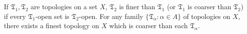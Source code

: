 If $\mathfrak{T}_1, \mathfrak{T}_2$ are topologies on a set $X$, $\mathfrak{T}_2$ is finer than $\mathfrak{T}_1$ (or $\mathfrak{T}_1$ is coarser than $\mathfrak{T}_2$) if every $\mathfrak{T}_1$-open set is $\mathfrak{T}_2$-open. For any family $\{\mathfrak{T}_\alpha: \alpha \in A\}$ of topologies on $X$, there exists a finest topology on $X$ which is coarser than each $\mathfrak{T}_\alpha$.
